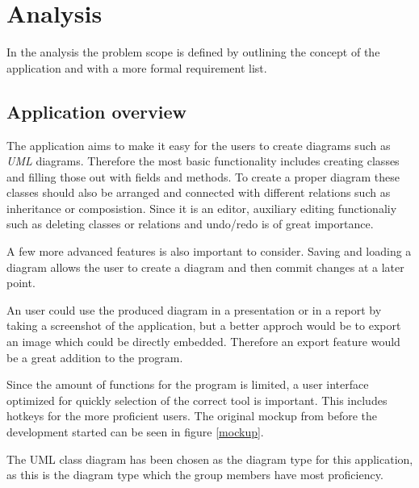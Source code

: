 \section{Analysis}
In the analysis the problem scope is defined by outlining the concept of the
application and with a more formal requirement list. 

\subsection{Application overview}
The application aims to make it easy for the users to create diagrams such as
\textit{UML} diagrams. Therefore the most basic functionality includes creating
classes and filling those out with fields and methods. To create a proper
diagram these classes should also be arranged and connected with different
relations such as inheritance or composistion. Since it is an editor, auxiliary
editing functionaliy such as deleting classes or relations and undo/redo is
of great importance. 

A few more advanced features is also important to consider. Saving and loading a
diagram allows the user to create a diagram and then commit changes at a later
point.

An user could use the produced diagram in a presentation or in a report by
taking a screenshot of the application, but a better approch would be to export
an image which could be directly embedded. Therefore an export feature would be
a great addition to the program. 

Since the amount of functions for the program is limited, a user interface
optimized for quickly selection of the correct tool is important. This
includes hotkeys for the more proficient users. The original mockup from before
the development started can be seen in figure \ref{mockup}.

The UML class diagram has been chosen as the diagram type for this application, 
as this is the diagram type which the group members have most proficiency.


